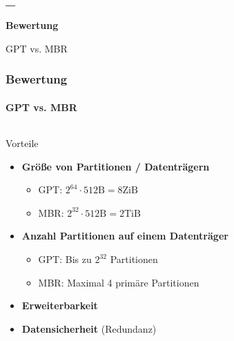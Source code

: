 \begin{frame}
    \frametitle{\_}

    \begin{center}
        \vspace{1.2cm}
        \Huge{\textbf{Bewertung}}

        \vspace{0.5cm}
        \LARGE{GPT vs. MBR}
    \end{center}
\end{frame}

\begin{frame}
    \frametitle{Bewertung}
    \framesubtitle{GPT vs. MBR}

    \begin{columns}[T]
        \begin{column}{0.55\textwidth}
            \begin{exampleblock}{Vorteile}
                \begin{itemize}
                    \item \textbf{Größe von Partitionen / Datenträgern}
                    \begin{itemize}
                        \item GPT: $ 2^{64} \cdot 512 \mathrm{B} = 8 \mathrm{ZiB} $
                        \item MBR: $ 2^{32} \cdot 512 \mathrm{B} = 2 \mathrm{TiB} $
                    \end{itemize}
                    
                    \vspace{0.2cm}
                    \item \textbf{Anzahl Partitionen auf einem Datenträger}
                    \vspace{-0.4cm}
                    \begin{itemize}
                        \item GPT: Bis zu $ 2^{32} $ Partitionen
                        \item MBR: Maximal 4 primäre Partitionen
                    \end{itemize}

                    \vspace{0.2cm}
                    \item \textbf{Erweiterbarkeit}

                    \vspace{0.2cm}
                    \item \textbf{Datensicherheit} (Redundanz)
                    

\end{itemize}
\end{exampleblock}
\end{column}
\end{columns}
\end{frame}
